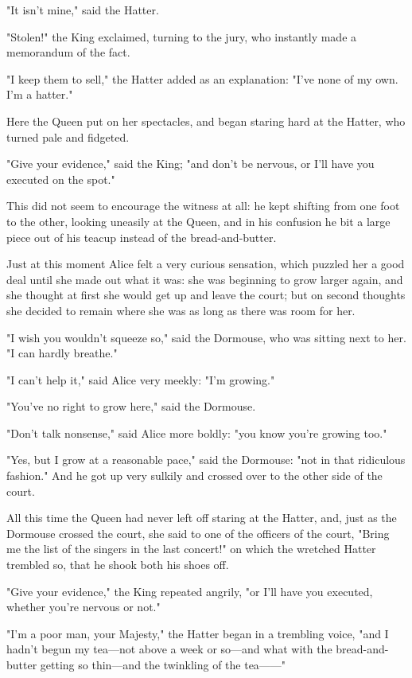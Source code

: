 "It isn't mine," said the Hatter.

"Stolen!" the King exclaimed, turning to the jury, who instantly made a memorandum of the fact.

"I keep them to sell," the Hatter added as an explanation: "I've none of my own. I'm a hatter."

Here the Queen put on her spectacles, and began staring hard at the Hatter, who turned pale and fidgeted.

"Give your evidence," said the King; "and don't be nervous, or I'll have you executed on the spot."

This did not seem to encourage the witness at all: he kept shifting from one foot to the other, looking uneasily at the Queen, and in his confusion he bit a large piece out of his teacup instead of the bread-and-butter.

​Just at this moment Alice felt a very curious sensation, which puzzled her a good deal until she made out what it was: she was beginning to grow larger again, and she thought at first she would get up and leave the court; but on second thoughts she decided to remain where she was as long as there was room for her.

"I wish you wouldn't squeeze so," said the Dormouse, who was sitting next to her. "I can hardly breathe."

"I can't help it," said Alice very meekly: "I'm growing."

"You've no right to grow here," said the Dormouse.

"Don't talk nonsense," said Alice more boldly: "you know you're growing too."

"Yes, but I grow at a reasonable pace," said the Dormouse: "not in that ridiculous fashion." And he got up very sulkily and crossed over to the other side of the court.

All this time the Queen had never left off staring at the Hatter, and, just as the Dormouse ​crossed the court, she said to one of the officers of the court, "Bring me the list of the singers in the last concert!" on which the wretched Hatter trembled so, that he shook both his shoes off.

"Give your evidence," the King repeated angrily, "or I'll have you executed, whether you're nervous or not."

"I'm a poor man, your Majesty," the Hatter began in a trembling voice, "and I hadn't begun my tea—not above a week or so—and what with the bread-and-butter getting so thin—and the twinkling of the tea——"

